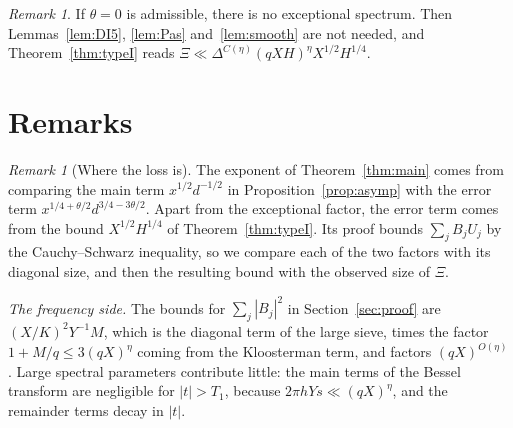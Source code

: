 \documentclass[11pt]{amsart}
\theoremstyle{remark}
\newtheorem{remark}[theorem]{Remark}
\theoremstyle{definition}
\numberwithin{equation}{section}
\begin{document}
\begin{remark}\label{rem:selberg}
If $\theta=0$ is admissible, there is no exceptional spectrum. Then Lemmas~\ref{lem:DI5}, \ref{lem:Pas} and~\ref{lem:smooth} are not needed, and Theorem~\ref{thm:typeI} reads $\Xi\ll\Delta^{C(\eta)}(qXH)^\eta X^{1/2}H^{1/4}$.
\end{remark}

\section{Remarks}\label{sec:remarks}

\begin{remark}[Where the loss is]\label{rem:exponent}
The exponent of Theorem~\ref{thm:main} comes from comparing the main term $x^{1/2}d^{-1/2}$ in Proposition~\ref{prop:asymp} with the error term $x^{1/4+\theta/2}d^{3/4-3\theta/2}$. Apart from the exceptional factor, the error term comes from the bound $X^{1/2}H^{1/4}$ of Theorem~\ref{thm:typeI}. Its proof bounds $\sum_jB_jU_j$ by the Cauchy--Schwarz inequality, so we compare each of the two factors with its diagonal size, and then the resulting bound with the observed size of $\Xi$.

\emph{The frequency side.} The bounds for $\sum_j|B_j|^2$ in Section~\ref{sec:proof} are $(X/K)^2Y^{-1}M$, which is the diagonal term of the large sieve, times the factor $1+M/q\le3(qX)^\eta$ coming from the Kloosterman term, and factors $(qX)^{O(\eta)}$. Large spectral parameters contribute little: the main terms of the Bessel transform are negligible for $|t|>T_1$, because $2\pi hYs\ll(qX)^\eta$, and the remainder terms decay in $|t|$.


\end{remark}
\end{document}
